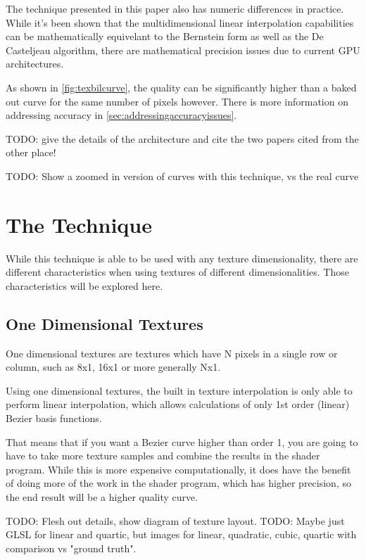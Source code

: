 \documentclass{jcgt}
\begin{document}
The technique presented in this paper also has numeric differences in practice.  While it's been shown that the multidimensional linear interpolation capabilities can be mathematically equivelant to the Bernstein form as well as the De Casteljeau algorithm, there are mathematical precision issues due to current GPU architectures.

As shown in \autoref{fig:texbilcurve}, the quality can be significantly higher than a baked out curve for the same number of pixels however.  There is more information on addressing accuracy in \autoref{sec:addressingaccuracyissues}.

TODO: give the details of the architecture and cite the two papers cited from the other place!

TODO: Show a zoomed in version of curves with this technique, vs the real curve

\section{The Technique}
\label{sec:thetechnique}

While this technique is able to be used with any texture dimensionality, there are different characteristics when using textures of different dimensionalities.  Those characteristics will be explored here.

\subsection{One Dimensional Textures}

One dimensional textures are textures which have N pixels in a single row or column, such as 8x1, 16x1 or more generally Nx1.

Using one dimensional textures, the built in texture interpolation is only able to perform linear interpolation, which allows calculations of only 1st order (linear) Bezier basis functions.

That means that if you want a Bezier curve higher than order 1, you are going to have to take more texture samples and combine the results in the shader program.  While this is more expensive computationally, it does have the benefit of doing more of the work in the shader program, which has higher precision, so the end result will be a higher quality curve.

TODO: Flesh out details, show diagram of texture layout.
TODO: Maybe just GLSL for linear and quartic, but images for linear, quadratic, cubic, quartic with comparison vs "ground truth".
\end{document}
